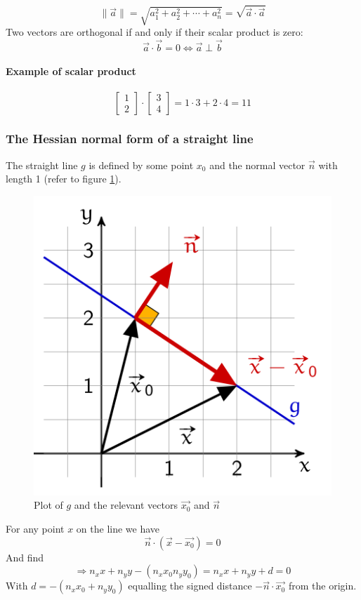 \documentclass[11pt]{article}
\begin{document}
\begin{equation}
    \| \vec{a} \| = \sqrt{a_1^2 + a_2^2 + \cdots + a_n^2} = \sqrt{\vec{a}\cdot\vec{a}}
\end{equation}
\noindent
Two vectors are orthogonal if and only if their scalar product is zero:
\begin{equation}
    \vec{a}\cdot\vec{b} = 0 \Leftrightarrow \vec{a} \perp \vec{b}
\end{equation}

\paragraph{Example of scalar product}
\begin{equation*}
    \begin{bmatrix}1\\2\end{bmatrix}\cdot\begin{bmatrix}3\\4\end{bmatrix} = 1\cdot 3 + 2\cdot 4 = 11
\end{equation*}

\subsubsection{The Hessian normal form of a straight line}

The straight line $g$ is defined by some point $x_0$ and the normal vector $\vec{n}$ with length 1 (refer to figure \ref{fig:hessiannormalform}).

\begin{figure}[htb!]
    \centering
    \includegraphics[keepaspectratio, width=0.4\linewidth]{Pictures/Hessian_normal_form}
    \caption{Plot of $g$ and the relevant vectors $\vec{x_0}$ and $\vec{n}$}
    \label{fig:hessiannormalform}
\end{figure}
\noindent
For any point $x$ on the line we have
\begin{equation*}
    \vec{n}\cdot(\vec{x}-\vec{x_0})=0
\end{equation*}
\noindent
And find
\begin{equation*}
    \Rightarrow n_x x + n_y y -(n_x x_0  n_y y_0) = n_x x +n_y y + d = 0
\end{equation*}
\noindent
With $d=-(n_x x_0 +n_y y_0)$ equalling the signed distance $-\vec{n}\cdot\vec{x_0}$ from the origin.
\end{document}
